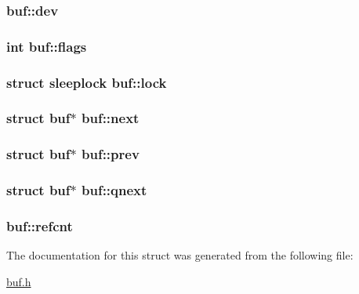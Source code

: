 \subsubsection[{\texorpdfstring{dev}{dev}}]{ buf\+::dev}\hypertarget{structbuf_ac96082c2b5f22133ac7092ef81487227}{}\label{structbuf_ac96082c2b5f22133ac7092ef81487227}
\subsubsection[{\texorpdfstring{flags}{flags}}]{\setlength{\rightskip}{0pt plus 5cm}int buf\+::flags}\hypertarget{structbuf_ae7d6b6c34fdeadb38970efd0554aa1a9}{}\label{structbuf_ae7d6b6c34fdeadb38970efd0554aa1a9}
\subsubsection[{\texorpdfstring{lock}{lock}}]{\setlength{\rightskip}{0pt plus 5cm}struct {\bf sleeplock} buf\+::lock}\hypertarget{structbuf_a626ad748d91d4bd7f4e65b74c73f2644}{}\label{structbuf_a626ad748d91d4bd7f4e65b74c73f2644}
\subsubsection[{\texorpdfstring{next}{next}}]{\setlength{\rightskip}{0pt plus 5cm}struct {\bf buf}$\ast$ buf\+::next}\hypertarget{structbuf_ab18c18abb22f07617619e9a74c71f51a}{}\label{structbuf_ab18c18abb22f07617619e9a74c71f51a}
\subsubsection[{\texorpdfstring{prev}{prev}}]{\setlength{\rightskip}{0pt plus 5cm}struct {\bf buf}$\ast$ buf\+::prev}\hypertarget{structbuf_a930cab1e1b3751795d31bfd0291dff4a}{}\label{structbuf_a930cab1e1b3751795d31bfd0291dff4a}
\subsubsection[{\texorpdfstring{qnext}{qnext}}]{\setlength{\rightskip}{0pt plus 5cm}struct {\bf buf}$\ast$ buf\+::qnext}\hypertarget{structbuf_aba5c088c4da07a5ec88edfacdae9b85a}{}\label{structbuf_aba5c088c4da07a5ec88edfacdae9b85a}
\subsubsection[{\texorpdfstring{refcnt}{refcnt}}]{ buf\+::refcnt}\hypertarget{structbuf_aaf5efe777371aaeb9944508fd52adda5}{}\label{structbuf_aaf5efe777371aaeb9944508fd52adda5}


The documentation for this struct was generated from the following file\+:\begin{DoxyCompactItemize}
\item 
\hyperlink{buf_8h}{buf.\+h}\end{DoxyCompactItemize}
